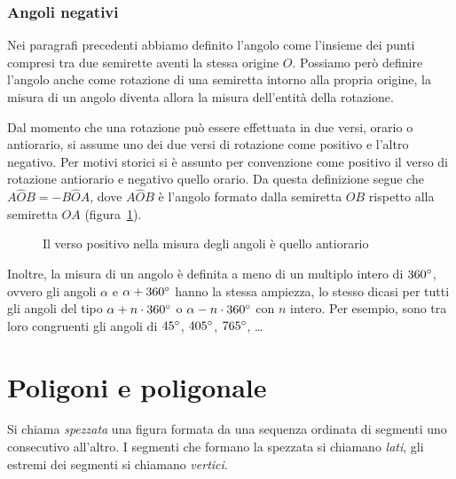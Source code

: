 \subsubsection{Angoli negativi}

Nei paragrafi precedenti abbiamo definito l'angolo come l'insieme dei punti compresi tra due semirette aventi la stessa origine $O$. Possiamo però definire l'angolo anche come rotazione di una semiretta intorno alla propria origine, la misura di un angolo diventa allora la misura dell'entità della rotazione.

Dal momento che una rotazione può essere effettuata in due versi, orario o antiorario, si assume uno dei due versi di rotazione come positivo e l'altro negativo. Per motivi storici si è assunto per convenzione come positivo il verso di rotazione antiorario e negativo quello orario.
Da questa definizione segue che $A\widehat{O}B = -B\widehat{O}A$, dove $A\widehat{O}B$ è l'angolo formato dalla semiretta $OB$ rispetto alla semiretta $OA$ (figura~\ref{fig:1.43}).

\begin{figure}[htb]
\centering
\caption{Il verso positivo nella misura degli angoli è quello antiorario}\label{fig:1.43}
\end{figure}

Inoltre, la misura di un angolo è definita a meno di un multiplo intero di $360{}^{\circ}$, ovvero gli angoli $\alpha$ e $\alpha+360{}^{\circ}$ hanno la stessa ampiezza, lo stesso dicasi per tutti gli angoli del tipo $\alpha+n\cdot 360{}^{\circ}$ o $\alpha - n\cdot 360{}^{\circ}$ con $n$ intero. Per esempio, sono tra loro congruenti gli angoli di $45{}^{\circ}$, $405{}^{\circ}$, $765{}^{\circ}$, \ldots{}

\vspazio\ovalbox{\risolvii \ref{ese:1.104}, \ref{ese:1.105}, \ref{ese:1.106}, \ref{ese:1.107}, \ref{ese:1.108}, \ref{ese:1.109}, \ref{ese:1.110}, \ref{ese:1.111}, \ref{ese:1.112}, \ref{ese:1.113}, \ref{ese:1.114},}

\ovalbox{\ref{ese:1.115}, \ref{ese:1.116}, \ref{ese:1.117}, \ref{ese:1.118}, \ref{ese:1.119}, \ref{ese:1.120}, \ref{ese:1.121}, \ref{ese:1.122}, \ref{ese:1.123}, \ref{ese:1.124}}


\section{Poligoni e poligonale}

\begin{definizione}
Si chiama \emph{spezzata} una figura formata da una sequenza ordinata di segmenti uno consecutivo all'altro. I segmenti che formano la spezzata si chiamano \emph{lati}, gli estremi dei segmenti si chiamano \emph{vertici}.
\end{definizione}

